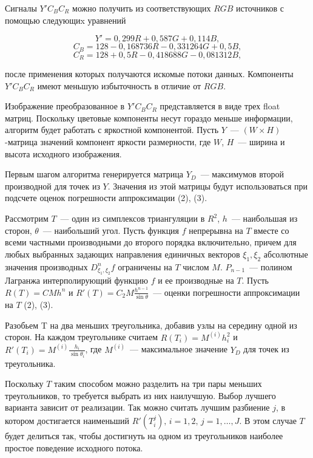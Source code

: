 \documentclass{spisok-article}
\begin{document}
Сигналы $Y' C_B C_R$ можно получить из соответствующих $RGB$ источников с
помощью следующиx уравнений \cite{miano2016}

$$Y' = 0,299R + 0,587G +0,114B,$$
$$C_B = 128 - 0,168736R-0,331264G+0,5B,$$
$$C_R = 128 + 0,5R - 0,418688G - 0,081312B,$$

после применения которых получаются искомые потоки данных. Компоненты $Y' C_B C_R$ имеют меньшую избыточность в отличие от $RGB$.%

Изображение преобразованное в $Y' C_B C_R$ представляется в виде трех float матриц. Поскольку цветовые компоненты несут гораздо меньше информации, алгоритм
будет работать с яркостной компонентой. Пусть $Y$~--- $(W \! \times \! H)$-матрица значений компонент яркости размерности, где $W$, $H$~--- ширина и высота исходного изображения.

Первым шагом алгоритма генерируется матрица $Y_D$~--- максимумов второй производной для точек из $Y$. Значения из этой матрицы будут использоваться при подсчете оценок погрешности аппроксимации (2), (3).

Рассмотрим $T$~--- один из симплексов триангуляции в $R^2$, $h$~--- наибольшая из сторон, $\theta$~--- наибольший угол. Пусть функция $f$
непрерывна на $T$ вместе со всеми частными производными до второго порядка включительно, причем для любых выбранных задающих направления единичных векторов
$\xi_1,\xi_2$ абсолютные значения производных $D^n_{\xi_1,\xi_2}f$ ограничены на $T$ числом $M$. $P_{n-1}$~--- полином Лагранжа интерполирующий функцию $f$ и ее производные на $T$. Пусть $R(T) = C M h^n$ и $R'(T) = C_2 M \frac {h^{n-1}} {\sin \theta}$~--- оценки погрешности аппроксимации на $T$ (2), (3).

Разобьем T на два меньших треугольника, добавив узлы на середину одной из сторон. На каждом треугольнике считаем $R(T_i) = M^{(i)} h_i^2$ и $R'(T_i) = M^{(i)} \frac {h_i}{\sin \theta_i}$, где $M^{(i)}$~--- максимальное значение $Y_D$ для точек из треугольника.

Поскольку $T$ таким способом можно разделить на три пары меньших треугольников, то требуется выбрать из них наилучшую. Выбор лучшего варианта зависит от реализации. Так можно считать лучшим разбиение $j$, в котором достигается наименьший $R'(T^j_i),\,i = 1,2,\, j=1,\dots,J$. В этом случае $T$ будет делиться так, чтобы достигнуть на одном из треугольников наиболее простое поведение исходного потока.
\end{document}

